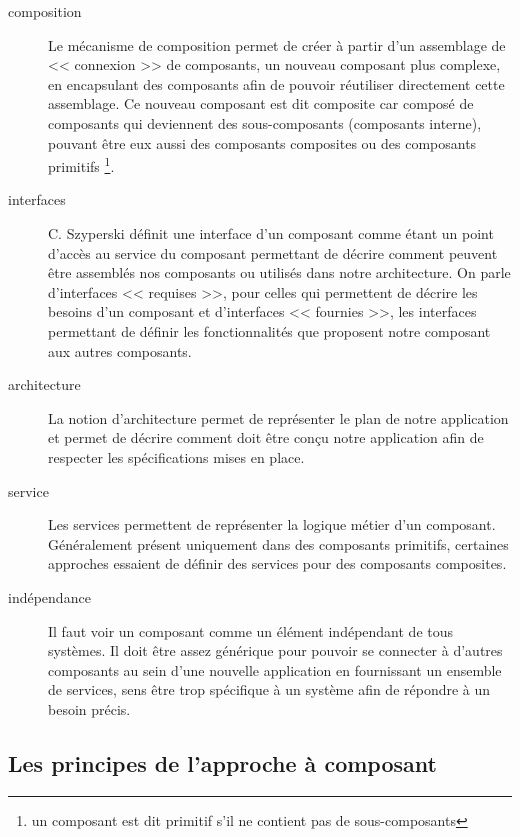 \begin{description}

  \item[composition] Le mécanisme de composition permet de créer à partir d'un assemblage de << connexion >> de composants, un nouveau composant plus complexe, en encapsulant des composants afin de pouvoir réutiliser directement cette assemblage. Ce nouveau composant est dit composite car composé de composants qui deviennent des sous-composants (composants interne), pouvant être eux aussi des composants composites ou des composants primitifs \footnote{un composant est dit primitif s'il ne contient pas de sous-composants}.
  
  \item[interfaces] C. Szyperski définit une interface d'un composant comme étant un point d'accès au service du composant \cite{szyperski1999components} permettant de décrire comment peuvent être assemblés nos composants ou utilisés dans notre architecture. On parle d'interfaces << requises >>, pour celles qui permettent de décrire les besoins d'un composant et d'interfaces << fournies >>, les interfaces permettant de définir les fonctionnalités que proposent notre composant aux autres composants.
  
  \item[architecture] La notion d'architecture permet de représenter le plan de notre application et permet de décrire comment doit être conçu notre application afin de respecter les spécifications mises en place.
 
  \item[service] Les services permettent de représenter la logique métier d'un composant. Géné\-ralement présent uniquement dans des composants primitifs, certaines approches essaient de définir des services pour des composants composites. 
  
  \item[indépendance] Il faut voir un composant comme un élément indépendant de tous systèmes. Il doit être assez générique pour pouvoir se connecter à d'autres composants au sein d'une nouvelle application en fournissant un ensemble de services, sens être trop spécifique à un système afin de répondre à un besoin précis.
  
\end{description}
    
    
\subsection{Les principes de l'approche à composant}

